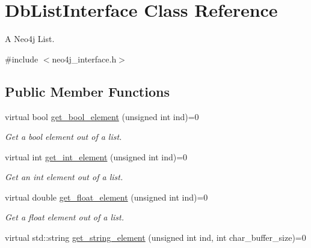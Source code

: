 \hypertarget{classDbListInterface}{\section{Db\-List\-Interface Class Reference}
\label{classDbListInterface}
}


A Neo4j List.  




{\ttfamily \#include $<$neo4j\-\_\-interface.\-h$>$}

\subsection*{Public Member Functions}
\begin{DoxyCompactItemize}
\item 
\hypertarget{classDbListInterface_aed51c97a5b72e67402d750bf8540b7b4}{virtual bool \hyperlink{classDbListInterface_aed51c97a5b72e67402d750bf8540b7b4}{get\-\_\-bool\-\_\-element} (unsigned int ind)=0}\label{classDbListInterface_aed51c97a5b72e67402d750bf8540b7b4}

\begin{DoxyCompactList}\small\item\em Get a bool element out of a list. \end{DoxyCompactList}\item 
\hypertarget{classDbListInterface_a21aa8acc708256af0e5b81f264961ab5}{virtual int \hyperlink{classDbListInterface_a21aa8acc708256af0e5b81f264961ab5}{get\-\_\-int\-\_\-element} (unsigned int ind)=0}\label{classDbListInterface_a21aa8acc708256af0e5b81f264961ab5}

\begin{DoxyCompactList}\small\item\em Get an int element out of a list. \end{DoxyCompactList}\item 
\hypertarget{classDbListInterface_aa9b41e8118f2e1689a84fe7611eef8a2}{virtual double \hyperlink{classDbListInterface_aa9b41e8118f2e1689a84fe7611eef8a2}{get\-\_\-float\-\_\-element} (unsigned int ind)=0}\label{classDbListInterface_aa9b41e8118f2e1689a84fe7611eef8a2}

\begin{DoxyCompactList}\small\item\em Get a float element out of a list. \end{DoxyCompactList}\item 
\hypertarget{classDbListInterface_ac30844705b9358941448b5ee3db91542}{virtual std\-::string \hyperlink{classDbListInterface_ac30844705b9358941448b5ee3db91542}{get\-\_\-string\-\_\-element} (unsigned int ind, int char\-\_\-buffer\-\_\-size)=0}\label{classDbListInterface_ac30844705b9358941448b5ee3db91542}


\end{DoxyCompactItemize}

